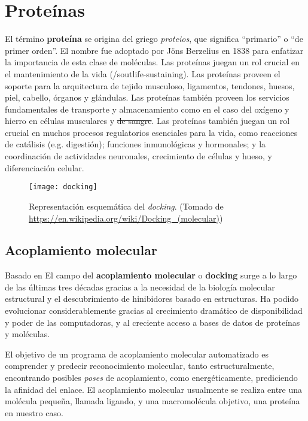 \section{Proteínas}
\cite{tamar}
El término \textbf{proteína} se origina del griego \textit{proteios},
que significa ``primario'' o ``de primer orden''. El nombre fue
adoptado por Jöns Berzelius en 1838 para enfatizar la importancia de
esta clase de moléculas. Las proteínas juegan un rol crucial en el
mantenimiento de la vida (/sout{life-sustaining}). Las proteínas
proveen el soporte para la arquitectura de tejido musculoso,
ligamentos, tendones, huesos, piel, cabello, órganos y glándulas. Las
proteínas también proveen los servicios fundamentales de transporte y
almacenamiento como en el caso del oxígeno y hierro en células
musculares y \sout{de sangre}. Las proteínas también juegan un rol
crucial en muchos procesos regulatorios esenciales para la vida, como
reacciones de catálisis (e.g. digestión); funciones inmunológicas y
hormonales;  y la coordinación de actividades neuronales, crecimiento
de células y hueso, y diferenciación celular.

\begin{figure}[h]
  \texttt{[image: docking]}
  \centering
  \caption{Representación esquemática del \textit{docking}.
    (Tomado de \url{https://en.wikipedia.org/wiki/Docking_(molecular)})}
\end{figure}

\subsection{Acoplamiento molecular}
Basado en \cite{kukol}
El campo del \textbf{acoplamiento molecular} o \textbf{docking}
surge a lo largo de las últimas tres décadas gracias a la necesidad de la
biología molecular estructural y el descubrimiento de hinibidores basado
en estructuras. Ha podido evolucionar considerablemente gracias al
crecimiento dramático de disponibilidad y poder de las computadoras, y
al creciente acceso a bases de datos de proteínas y moléculas.

El objetivo de un programa de acoplamiento molecular automatizado es
comprender y predecir reconocimiento molecular, tanto
estructuralmente, encontrando posibles \textit{poses} de acoplamiento,
como energéticamente, prediciendo la afinidad del enlace. El
acoplamiento molecular usualmente se realiza entre una molécula
pequeña, llamada ligando, y una macromolécula objetivo, una proteína
en nuestro caso.

